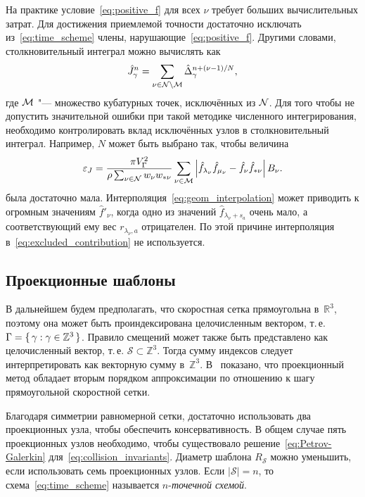 На практике условие~\eqref{eq:positive_f} для всех \(\nu\) требует больших вычислительных затрат.
Для достижения приемлемой точности достаточно исключать из~\eqref{eq:time_scheme} члены,
нарушающие~\eqref{eq:positive_f}. Другими словами, столкновительный интеграл можно вычислять как
\begin{equation}\label{eq:discrete_short_ci_discarded}
    \hat{J}_\gamma^n = \sum_{\nu\in\mathcal{N}\setminus\mathcal{M}} \hat{\Delta}_\gamma^{n+(\nu-1)/N},
\end{equation}
где \(\mathcal{M}\) "--- множество кубатурных точек, исключённых из \(\mathcal{N}\).
Для того чтобы не допустить значительной ошибки при такой методике численного интегрирования,
необходимо контролировать вклад исключённых узлов в столкновительный интеграл.
Например, \(N\) может быть выбрано так, чтобы величина
\begin{equation}\label{eq:excluded_contribution}
    \varepsilon_J = \frac{\pi V_\Gamma^2}{\rho\sum_{\nu\in\mathcal{N}} w_{\nu}w_{*\nu}}
        \sum_{\nu\in\mathcal{M}} \left|
            \hat{f}_{\lambda_\nu}\hat{f}_{\mu_\nu} - \hat{f}_{\nu}\hat{f}_{*\nu}
        \right|B_\nu.
\end{equation}
была достаточно мала.
Интерполяция~\eqref{eq:geom_interpolation} может приводить к огромным значениям \(\hat{f}'_{\nu}\),
когда одно из значений \(\hat{f}_{\lambda_\nu+s_a}\) очень мало,
а соответствующий ему вес \(r_{\lambda_\nu,a}\) отрицателен.
По этой причине интерполяция в~\eqref{eq:excluded_contribution} не используется.

\subsection{Проекционные шаблоны}

В дальнейшем будем предполагать, что скоростная сетка прямоугольна в~\(\mathbb{R}^3\),
поэтому она может быть проиндексирована целочисленным вектором, т.\,е. \(\Gamma = \{\,{\gamma}:{\gamma\in\mathbb{Z}^3}\,\}\).
Правило смещений может также быть представлено как целочисленный вектор, т.\,е. \(\mathcal{S}\subset\mathbb{Z}^3\).
Тогда сумму индексов следует интерпретировать как векторную сумму в~\(\mathbb{Z}^3\).
В~\cite{Anikin2012} показано, что проекционный метод обладает вторым порядком аппроксимации
по отношению к шагу прямоугольной скоростной сетки.

Благодаря симметрии равномерной сетки,
достаточно использовать два проекционных узла, чтобы обеспечить консервативность.
В общем случае пять проекционных узлов необходимо,
чтобы существовало решение~\eqref{eq:Petrov-Galerkin} для~\eqref{eq:collision_invariants}.
Диаметр шаблона \(R_\mathcal{S}\) можно уменьшить, если использовать семь проекционных узлов.
Если \(|\mathcal{S}|=n\), то схема~\eqref{eq:time_scheme} называется \(n\)-\emph{точечной схемой}.

